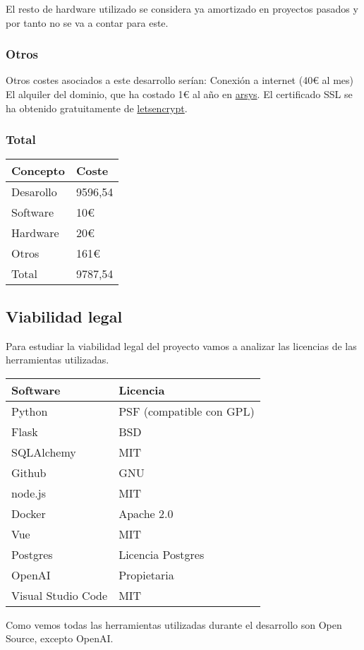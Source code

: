 El resto de hardware utilizado se considera ya amortizado en proyectos 
pasados y por tanto no se va a contar para este.


\subsubsection{Otros}

Otros costes asociados a este desarrollo serían:
Conexión a internet (40€ al mes)
El alquiler del dominio, que ha costado 1€ al año en \href{https://www.arsys.es/}{arsys}.
El certificado SSL se ha obtenido gratuitamente de \href{https://letsencrypt.org/}{letsencrypt}.

\subsubsection{Total}

\begin{tabular}{l l}
    \hline
    \textbf{Concepto} & \textbf{Coste}\\ \hline
    Desarollo &  9596,54\\ \hline
    Software & 10€\\ \hline
    Hardware & 20€\\ \hline
    Otros & 161€\\ \hline
    Total & 9787,54\\ \hline
\end{tabular}

\subsection{Viabilidad legal}

Para estudiar la viabilidad legal del proyecto vamos a analizar las licencias de las
herramientas utilizadas.

\begin{tabular}{l l}
    \hline
    \textbf{Software} & \textbf{Licencia}\\ \hline
    Python & PSF (compatible con GPL) \\ \hline
    Flask & BSD\\ \hline
    SQLAlchemy & MIT\\ \hline
    Github & GNU\\ \hline
    node.js & MIT\\ \hline
    Docker & Apache 2.0\\ \hline
    Vue & MIT\\ \hline
    Postgres & Licencia Postgres\\ \hline
    OpenAI & Propietaria\\ \hline
    Visual Studio Code & MIT \\ \hline
\end{tabular}

Como vemos todas las herramientas utilizadas durante el desarrollo son Open Source, 
excepto OpenAI.